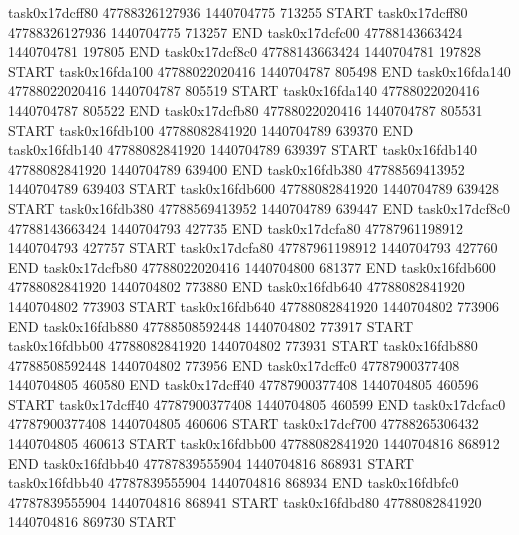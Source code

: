 task0x17dcff80 47788326127936          1440704775               713255  START
task0x17dcff80 47788326127936          1440704775               713257  END
task0x17dcfc00 47788143663424          1440704781               197805  END
task0x17dcf8c0 47788143663424          1440704781               197828  START
task0x16fda100 47788022020416          1440704787               805498  END
task0x16fda140 47788022020416          1440704787               805519  START
task0x16fda140 47788022020416          1440704787               805522  END
task0x17dcfb80 47788022020416          1440704787               805531  START
task0x16fdb100 47788082841920          1440704789               639370  END
task0x16fdb140 47788082841920          1440704789               639397  START
task0x16fdb140 47788082841920          1440704789               639400  END
task0x16fdb380 47788569413952          1440704789               639403  START
task0x16fdb600 47788082841920          1440704789               639428  START
task0x16fdb380 47788569413952          1440704789               639447  END
task0x17dcf8c0 47788143663424          1440704793               427735  END
task0x17dcfa80 47787961198912          1440704793               427757  START
task0x17dcfa80 47787961198912          1440704793               427760  END
task0x17dcfb80 47788022020416          1440704800               681377  END
task0x16fdb600 47788082841920          1440704802               773880  END
task0x16fdb640 47788082841920          1440704802               773903  START
task0x16fdb640 47788082841920          1440704802               773906  END
task0x16fdb880 47788508592448          1440704802               773917  START
task0x16fdbb00 47788082841920          1440704802               773931  START
task0x16fdb880 47788508592448          1440704802               773956  END
task0x17dcffc0 47787900377408          1440704805               460580  END
task0x17dcff40 47787900377408          1440704805               460596  START
task0x17dcff40 47787900377408          1440704805               460599  END
task0x17dcfac0 47787900377408          1440704805               460606  START
task0x17dcf700 47788265306432          1440704805               460613  START
task0x16fdbb00 47788082841920          1440704816               868912  END
task0x16fdbb40 47787839555904          1440704816               868931  START
task0x16fdbb40 47787839555904          1440704816               868934  END
task0x16fdbfc0 47787839555904          1440704816               868941  START
task0x16fdbd80 47788082841920          1440704816               869730  START
